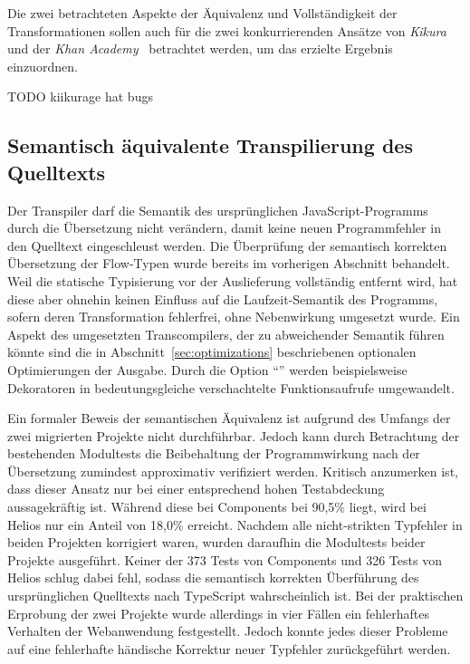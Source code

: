 Die zwei betrachteten Aspekte der Äquivalenz und Vollständigkeit der Transformationen sollen auch für die zwei konkurrierenden Ansätze von \textit{Kikura}~\autocite{KIKURA:FLOW_TO_TS} und der \textit{Khan Academy}~\autocite{KHAN:FLOW_TO_TS} betrachtet werden, um das erzielte Ergebnis einzuordnen.

TODO kiikurage hat bugs


\subsection{Semantisch äquivalente Transpilierung des Quelltexts}

Der Transpiler darf die Semantik des ursprünglichen JavaScript-Programms durch die Übersetzung nicht verändern, damit keine neuen Programmfehler in den Quelltext eingeschleust werden. Die Überprüfung der semantisch korrekten Übersetzung der Flow-Typen wurde bereits im vorherigen Abschnitt behandelt. Weil die statische Typisierung vor der Auslieferung vollständig entfernt wird, hat diese aber ohnehin keinen Einfluss auf die Laufzeit-Semantik des Programms, sofern deren Transformation fehlerfrei, ohne Nebenwirkung umgesetzt wurde. Ein Aspekt des umgesetzten Transcompilers, der zu abweichender Semantik führen könnte sind die in Abschnitt~\ref{sec:optimizations} beschriebenen optionalen Optimierungen der Ausgabe. Durch die Option \enquote{} werden beispielsweise Dekoratoren in bedeutungsgleiche verschachtelte Funktionsaufrufe umgewandelt.

Ein formaler Beweis der semantischen Äquivalenz ist aufgrund des Umfangs der zwei migrierten Projekte nicht durchführbar. Jedoch kann durch Betrachtung der bestehenden Modultests die Beibehaltung der Programmwirkung nach der Übersetzung zumindest approximativ verifiziert werden. Kritisch anzumerken ist, dass dieser Ansatz nur bei einer entsprechend hohen Testabdeckung aussagekräftig ist. Während diese bei Components bei 90,5\% liegt, wird bei Helios nur ein Anteil von 18,0\% erreicht. Nachdem alle nicht-strikten Typfehler in beiden Projekten korrigiert waren, wurden daraufhin die Modultests beider Projekte ausgeführt. Keiner der 373 Tests von Components und 326 Tests von Helios schlug dabei fehl, sodass die semantisch korrekten Überführung des ursprünglichen Quelltexts nach TypeScript wahrscheinlich ist.
Bei der praktischen Erprobung der zwei Projekte wurde allerdings in vier Fällen ein fehlerhaftes Verhalten der Webanwendung festgestellt. Jedoch konnte jedes dieser Probleme auf eine fehlerhafte händische Korrektur neuer Typfehler zurückgeführt werden.

